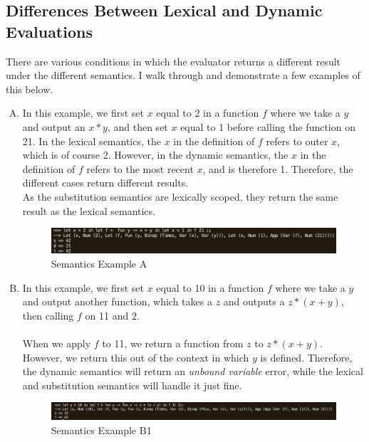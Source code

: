 \documentclass{article}
\begin{document}
\subsection{Differences Between Lexical and Dynamic Evaluations}
There are various conditions in which the evaluator returns a different result under the different semantics. I walk through and demonstrate a few examples of this below.\\
\begin{enumerate}[A.]
\item
In this example, we first set $x$ equal to 2 in a function $f$ where we take a $y$ and output an $x*y$, and then set $x$ equal to 1 before calling the function on 21. In the lexical semantics, the $x$ in the definition of $f$ refers to outer $x$, which is of course 2. However, in the dynamic semantics, the $x$ in the definition of $f$ refers to the most recent $x$, and is therefore 1. Therefore, the different cases return different results.\\As the substitution semantics are lexically scoped, they return the same result as the lexical semantics.
\begin{figure}[h]\begin{center}
    \includegraphics[width =\textwidth]{lddiff1.png}
    \caption{Semantics Example A}
\end{center} \end{figure}
\item
In this example, we first set $x$ equal to 10 in a function $f$ where we take a $y$ and output another function, which takes a $z$ and outputs a $z*(x+y)$, then calling $f$ on 11 and 2. \\\\
When we apply $f$ to 11, we return a function from $z$ to $z*(x+y)$. However, we return this out of the context in which $y$ is defined. Therefore, the dynamic semantics will return an \textit{unbound variable} error, while the lexical and substitution semantics will handle it just fine.
\begin{figure}[h]\begin{center}
    \includegraphics[width =\textwidth]{lddiff2a.png}
    \caption{Semantics Example B1}
\end{center} \end{figure}\\

\end{enumerate}
\end{document}
